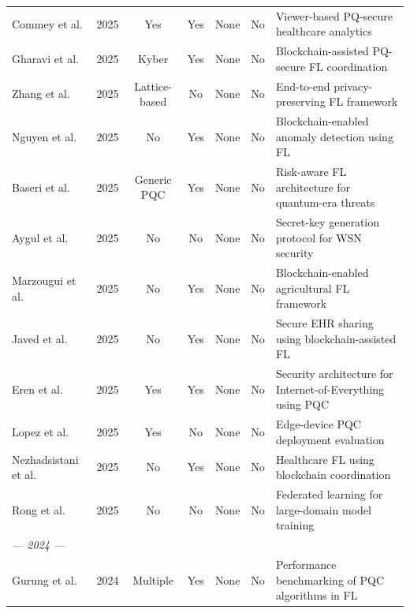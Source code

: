 \documentclass[journal, 10pt, twocolumn]{IEEEtran}
\begin{document}
\begin{table}[htbp]
\begin{tabularx}{\textwidth}{l c c c c c X}
Commey et al. \cite{commey2025_health}
& 2025 & Yes & Yes & None & No
& Viewer-based PQ-secure healthcare analytics \\

Gharavi et al. \cite{gharavi2025}
& 2025 & Kyber & Yes & None & No
& Blockchain-assisted PQ-secure FL coordination \\

Zhang et al. \cite{zhang2025}
& 2025 & Lattice-based & No & None & No
& End-to-end privacy-preserving FL framework \\

Nguyen et al. \cite{nguyen2025}
& 2025 & No & Yes & None & No
& Blockchain-enabled anomaly detection using FL \\

Baseri et al. \cite{baseri2025}
& 2025 & Generic PQC & Yes & None & No
& Risk-aware FL architecture for quantum-era threats \\

Aygul et al. \cite{aygul2025}
& 2025 & No & No & None & No
& Secret-key generation protocol for WSN security \\

Marzougui et al. \cite{marzougui2025}
& 2025 & No & Yes & None & No
& Blockchain-enabled agricultural FL framework \\

Javed et al. \cite{javed2025}
& 2025 & No & Yes & None & No
& Secure EHR sharing using blockchain-assisted FL \\

Eren et al. \cite{eren2025}
& 2025 & Yes & Yes & None & No
& Security architecture for Internet-of-Everything using PQC \\

Lopez et al. \cite{lopez2025}
& 2025 & Yes & No & None & No
& Edge-device PQC deployment evaluation \\

Nezhadsistani et al. \cite{nezhadsistani2025}
& 2025 & No & Yes & None & No
& Healthcare FL using blockchain coordination \\

Rong et al. \cite{rong2025}
& 2025 & No & No & None & No
& Federated learning for large-domain model training \\

\multicolumn{7}{l}{\textit{--- 2024 ---}} \\

Gurung et al. \cite{gurung2024}
& 2024 & Multiple & Yes & None & No
& Performance benchmarking of PQC algorithms in FL \\


\end{tabularx}
\end{table}
\end{document}
